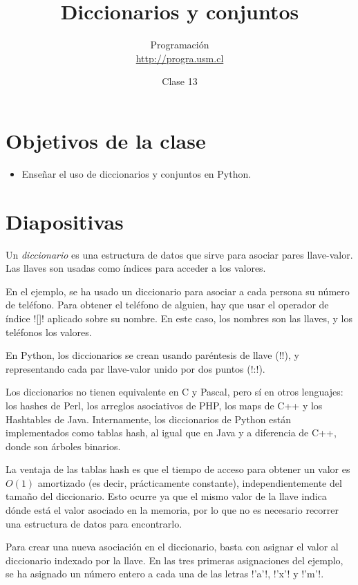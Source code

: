 \documentclass[10pt]{article}
\title{Diccionarios y conjuntos}
\author{Programación \\ \url{http://progra.usm.cl}}
\date{Clase 13}
\begin{document}
  \maketitle

  \section*{Objetivos de la clase}
  \begin{itemize}
    \item Enseñar el uso de diccionarios y conjuntos en Python.
  \end{itemize}

  \section*{Diapositivas}


  Un \emph{diccionario} es una estructura de datos
  que sirve para asociar pares llave-valor.
  Las llaves son usadas como índices
  para acceder a los valores.

  En el ejemplo,
  se ha usado un diccionario
  para asociar a cada persona su número de teléfono.
  Para obtener el teléfono de alguien,
  hay que usar el operador de índice \li![]!
  aplicado sobre su nombre.
  En este caso,
  los nombres son las llaves,
  y los teléfonos los valores.

  En Python, los diccionarios se crean usando paréntesis de llave (\li!{}!),
  y representando cada par llave-valor unido por dos puntos (\li!:!).

  Los diccionarios no tienen equivalente en C y Pascal,
  pero sí en otros lenguajes:
  los hashes de Perl,
  los arreglos asociativos de PHP,
  los maps de C++
  y los Hashtables de Java.
  Internamente,
  los diccionarios de Python están implementados como tablas hash,
  al igual que en Java y a diferencia de C++, donde son árboles binarios.

  La ventaja de las tablas hash
  es que el tiempo de acceso para obtener un valor es \(O(1)\) amortizado
  (es decir, prácticamente constante),
  independientemente del tamaño del diccionario.
  Esto ocurre ya que el mismo valor de la llave
  indica dónde está el valor asociado en la memoria,
  por lo que no es necesario recorrer una estructura de datos
  para encontrarlo.


  Para crear una nueva asociación en el diccionario,
  basta con asignar el valor al diccionario indexado por la llave.
  En las tres primeras asignaciones del ejemplo,
  se ha asignado un número entero
  a cada una de las letras \li!'a'!, \li!'x'! y \li!'m'!.
\end{document}
